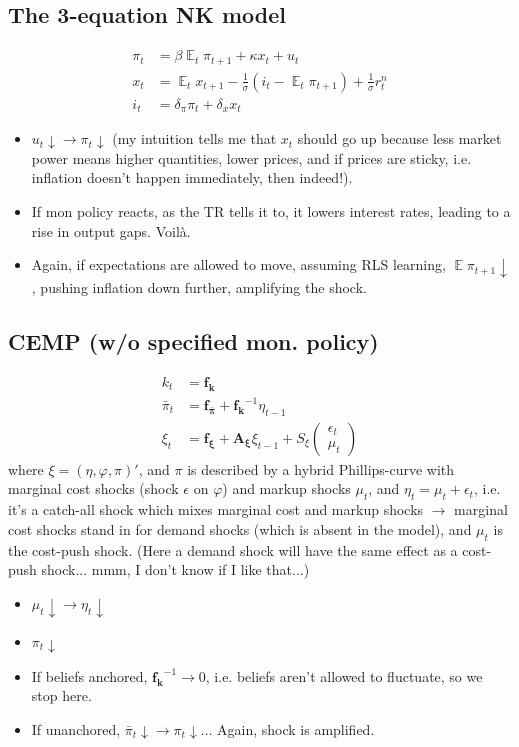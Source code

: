\documentclass[11pt]{article}
\renewcommand{\[}{\begin{equation}}
\renewcommand{\]}{\end{equation}}
\DeclareMathOperator{\E}{\mathbb{E}}
\begin{document}
\subsection{The 3-equation NK model}
\begin{align}
\pi_t & = \beta \E_t\pi_{t+1} + \kappa x_t  + u_t\\
x_t & = \E_t x_{t+1} -\frac{1}{\sigma} (i_t - \E_t\pi_{t+1}) + \frac{1}{\sigma}r_t^n \\
i_t & = \delta_{\pi} \pi_t + \delta_x x_t
\end{align}
\begin{itemize}
\item $u_t \downarrow \rightarrow \pi_t \downarrow$ (my intuition tells me that $x_t$ should go up because less market power means higher quantities, lower prices, and if prices are sticky, i.e. inflation doesn't happen immediately, then indeed!).
\item If mon policy reacts, as the TR tells it to, it lowers interest rates, leading to a rise in output gaps. Voil\`a. 
\item Again, if expectations are allowed to move, assuming RLS learning, $\E\pi_{t+1} \downarrow$, pushing inflation down further, amplifying the shock. 
\end{itemize}

	
\subsection{CEMP (w/o specified mon. policy)}
\begin{align}
k_t & = \mathbf{f_k} \\
\bar{\pi}_t &=\mathbf{f_{\bar{\pi}}} + \mathbf{f_k}^{-1}\eta_{t-1}\\
\xi_t & = \mathbf{f_{\xi}} + \mathbf{A_{\xi}} \xi_{t-1} + S_{\xi} \begin{pmatrix} \epsilon_t \\ \mu_t \end{pmatrix} 
\end{align}
where $\xi = (\eta, \varphi, \pi)'$, and $\pi$ is described by a hybrid Phillips-curve with marginal cost shocks (shock $\epsilon$ on $\varphi$) and markup shocks $\mu_t$, and $\eta_t = \mu_t + \epsilon_t$, i.e. it's a catch-all shock which mixes marginal cost and markup shocks $\rightarrow$ marginal cost shocks stand in for demand shocks (which is absent in the model), and $\mu_t$ is the cost-push shock. (Here a demand shock will have the same effect as a cost-push shock... mmm, I don't know if I like that...)
\begin{itemize}
\item $\mu_t \downarrow \rightarrow \eta_t \downarrow$
\item $\pi_t \downarrow$
\item If beliefs anchored, $\mathbf{f_k}^{-1} \rightarrow 0$, i.e. beliefs aren't allowed to fluctuate, so we stop here.
\item If unanchored, $\bar{\pi}_t \downarrow \rightarrow \pi_t \downarrow \dots$ Again, shock is amplified. 
\end{itemize}
\end{document}
